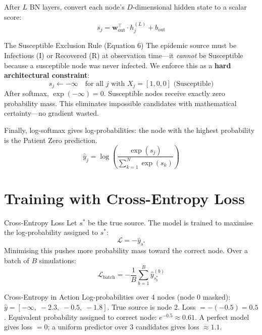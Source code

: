 After $L$ BN layers, convert each node's $D$-dimensional hidden state to a scalar score:
\[
s_j = \mathbf{w}_{\text{out}}^\top \cdot h_j^{(L)} + b_{\text{out}}
\]

\begin{conceptbox}{The Susceptible Exclusion Rule (Equation 6)}
The epidemic source must be Infectious (I) or Recovered (R) at observation time---it \emph{cannot} be Susceptible because a susceptible node was never infected. We enforce this as a \textbf{hard architectural constraint}:
\[
s_j \leftarrow -\infty \quad \text{for all } j \text{ with } X_j = [1,0,0] \text{ (Susceptible)}
\]
After softmax, $\exp(-\infty) = 0$. Susceptible nodes receive exactly zero probability mass. This eliminates impossible candidates with mathematical certainty---no gradient wasted.
\end{conceptbox}

Finally, log-softmax gives log-probabilities: the node with the highest probability is the Patient Zero prediction.
\[
\hat{y}_j = \log\!\left(\frac{\exp(s_j)}{\sum_{k=1}^{N} \exp(s_k)}\right)
\]

\section{Training with Cross-Entropy Loss}

\begin{mathbox}{Cross-Entropy Loss}
Let $s^*$ be the true source. The model is trained to maximise the log-probability assigned to $s^*$:
\[
\mathcal{L} = -\hat{y}_{s^*}
\]
Minimising this pushes more probability mass toward the correct node. Over a batch of $B$ simulations:
\[
\mathcal{L}_{\text{batch}} = -\frac{1}{B} \sum_{b=1}^{B} \hat{y}_{s^*_b}^{(b)}
\]
\end{mathbox}

\begin{examplebox}{Cross-Entropy in Action}
Log-probabilities over 4 nodes (node 0 masked): $\hat{y} = [-\infty,\; -2.3,\; -0.5,\; -1.8]$. True source is node 2. Loss $= -(-0.5) = 0.5$. Equivalent probability assigned to correct node: $e^{-0.5} \approx 0.61$. A perfect model gives loss $= 0$; a uniform predictor over 3 candidates gives loss $\approx 1.1$.
\end{examplebox}

